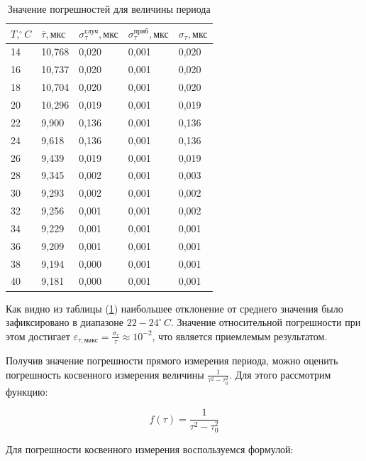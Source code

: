 \documentclass[10pt,a4paper]{article}
\begin{document}
		\begin{table}[h!]
\centering
\begin{tabular}{|l|l|l|l|l|}
\hline
$T, ^{\circ} C$ & $\overline{\tau}, \text{мкс}$ & $\sigma_{\tau}^{\text{случ}}, \text{мкс}$ & $\sigma_{\tau}^{\text{приб}}, \text{мкс}$ & $\sigma_{\tau}, \text{мкс}$ \\ \hline
14 & 10,768 & 0,020 & 0,001 & 0,020 \\ \hline
16 & 10,737 & 0,020 & 0,001 & 0,020 \\ \hline
18 & 10,704 & 0,020 & 0,001 & 0,020 \\ \hline
20 & 10,296 & 0,019 & 0,001 & 0,019 \\ \hline
22 & 9,900  & 0,136 & 0,001 & 0,136 \\ \hline
24 & 9,618  & 0,136 & 0,001 & 0,136 \\ \hline
26 & 9,439  & 0,019 & 0,001 & 0,019 \\ \hline
28 & 9,345  & 0,002 & 0,001 & 0,003 \\ \hline
30 & 9,293  & 0,002 & 0,001 & 0,002 \\ \hline
32 & 9,256  & 0,001 & 0,001 & 0,002 \\ \hline
34 & 9,229  & 0,001 & 0,001 & 0,001 \\ \hline
36 & 9,209  & 0,001 & 0,001 & 0,001 \\ \hline
38 & 9,194  & 0,000 & 0,001 & 0,001 \\ \hline
40 & 9,181  & 0,000 & 0,001 & 0,001 \\ \hline
\end{tabular}
\caption{Значение погрешностей для величины периода}
\label{tab:errors_period}
\end{table}

		Как видно из таблицы (\ref{tab:errors_period}) наибольшее отклонение от среднего значения было зафиксировано в диапазоне $22-24 ^{\circ}\, C$. Значение относительной погрешности при этом достигает $\varepsilon_{\tau, \text{макс}} = \frac{\sigma_{\tau}}{\tau} \approx 10^{-2}$, что является приемлемым результатом.
		
		Получив значение погрешности прямого измерения периода, можно оценить погрешность косвенного измерения величины $\frac{1}{\tau^{2} - \tau^{2}_{0}}$. Для этого рассмотрим функцию:
		
		\begin{equation}
			f\left(\tau\right) = \frac{1}{\tau^{2} - \tau^{2}_{0}}
		\end{equation}	
		
		Для погрешности косвенного измерения воспользуемся формулой:
		
\end{document}
